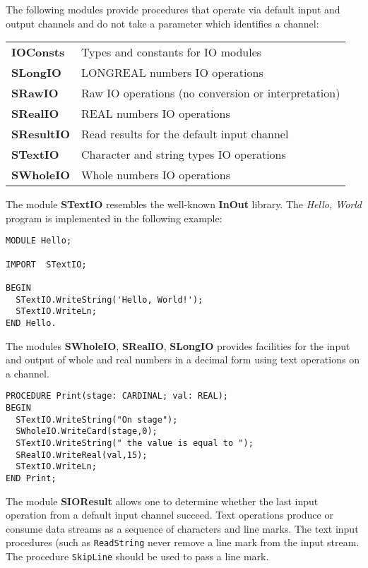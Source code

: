 The following modules provide procedures that operate via default
input and output channels and do not take a parameter which identifies
a channel:
\begin{flushleft}
\begin{tabular}{ll}
\bf IOConsts  & Types and constants for IO modules                     \\
\bf SLongIO   & LONGREAL numbers IO operations                         \\
\bf SRawIO    & Raw IO operations (no conversion or interpretation)    \\
\bf SRealIO   & REAL numbers IO operations                             \\
\bf SResultIO & Read results for the default input channel             \\
\bf STextIO   & Character and string types IO operations               \\
\bf SWholeIO  & Whole numbers IO operations                            \\
\end{tabular}
\end{flushleft}

\noindent
The module {\bf STextIO} resembles the well-known {\bf InOut} library.
The {\em Hello, World} program is implemented in the following example:
\begin{verbatim}
MODULE Hello;

IMPORT  STextIO;

BEGIN
  STextIO.WriteString('Hello, World!');
  STextIO.WriteLn;
END Hello.
\end{verbatim}

The modules {\bf SWholeIO}, {\bf SRealIO}, {\bf SLongIO} provides
facilities for the input and output of whole and real numbers in
a decimal form using text operations on a channel.

\begin{verbatim}
PROCEDURE Print(stage: CARDINAL; val: REAL);
BEGIN
  STextIO.WriteString("On stage");
  SWholeIO.WriteCard(stage,0);
  STextIO.WriteString(" the value is equal to ");
  SRealIO.WriteReal(val,15);
  STextIO.WriteLn;
END Print;
\end{verbatim}

The module {\bf SIOResult} allows one to determine whether the last
input operation from a default input channel succeed. Text
operations produce or consume data streams as a sequence of
characters and line marks. The text input procedures (such as
{\tt ReadString} never remove a line mark from the input stream.
The procedure {\tt SkipLine} should be used to pass a line mark.

